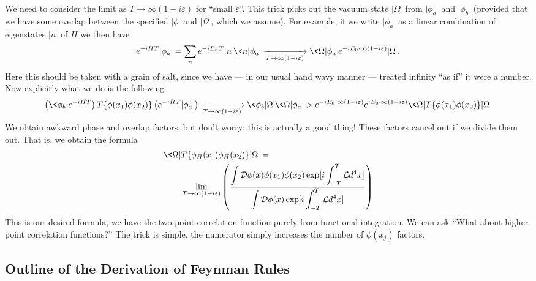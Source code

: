 We need to consider the limit as $T\to\infty(1-i\varepsilon)$ for
``small $\varepsilon$''. This trick picks out the vacuum state
$|\Omega\>$ from $|\phi_a\>$ and $|\phi_b\>$ (provided that we
have some overlap between the specified $|\phi\>$ and
$|\Omega\>$, which we assume). For example, if we write
$|\phi_a\>$ as a linear combination of eigenstates $|n\>$ of $H$
we then have
\begin{equation}%
e^{-iHT}|\phi_{a}\> = \sum_{n}e^{-iE_{n}T}|n\>\<n|\phi_a\>\xrightarrow[T\to\infty(1-i\varepsilon)]{}\<\Omega|\phi_a\>e^{-iE_{0}\cdot\infty(1-i\varepsilon)}|\Omega\>.
\end{equation}
Here this should be taken with a grain of salt, since we have ---
in our usual hand wavy manner --- treated infinity ``as if'' it
were a number. Now explicitly what we do is the following
\begin{equation}%
\left(\<\phi_{b}|e^{-iHT}\right)T\{\phi(x_1)\phi(x_2)\}\left(e^{-iHT}|\phi_{a}\>\right)\xrightarrow[T\to\infty(1-i\varepsilon)]{}\<\phi_b|\Omega\>\<\Omega|\phi_a\>>e^{-iE_{0}\cdot\infty(1-i\varepsilon)}e^{iE_{0}\cdot\infty(1-i\varepsilon)}\<\Omega|T\{\phi(x_1)\phi(x_2)\}|\Omega\>
\end{equation}
We obtain awkward phase and overlap factors, but
don't worry: this is actually a good thing! These factors cancel
out if we divide them out. That is, we obtain the formula
\begin{equation}\label{eq:functionalIntegralTwoPointCorrelationFunction}
\begin{split}
\<\Omega|&T\{\phi_{H}(x_1)\phi_{H}(x_2)\}|\Omega\> =\\& \lim_{T\to\infty(1-i\varepsilon)}\left(\frac{\displaystyle\int\mathcal{D}\phi(x)\phi(x_1)\phi(x_2)\exp[i\int^{T}_{-T}\mathcal{L}d^{4}x]}{\displaystyle\int\mathcal{D}\phi(x)\exp[i\int^{T}_{-T}\mathcal{L}d^{4}x]}\right)
\end{split}
\end{equation}
This is our desired formula, we have the two-point correlation
function purely from functional integration. We can ask ``What
about higher-point correlation functions?'' The trick is simple,
the numerator simply increases the number of $\phi(x_j)$ factors.

\subsection*{Outline of the Derivation of Feynman Rules}


